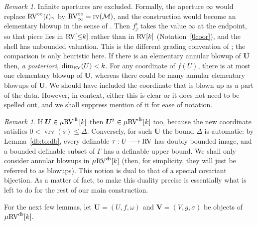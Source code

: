 \documentclass[12pt]{amsart}
\theoremstyle{plain}
\theoremstyle{definition}
\theoremstyle{remark}
\newtheorem{rem}[thm]{Remark}
\numberwithin{equation}{section}
\theoremstyle{plain}
\newcommand{\RV}{\textup{RV}}
\newcommand{\MM}{\mdl M}
\newcommand{\0}{\emptyset}
\newcommand{\mdl}[1]{\mathcal{#1}}  %
\newcommand{\fun}{\longrightarrow}
\newcommand{\mRV}{{\mu}{\RV}}
\DeclareMathOperator{\rv}{rv}
\DeclareMathOperator{\vrv}{vrv}
\DeclareMathOperator{\db}{d \! b}
\newcommand{\ccirc}{\circ \circ}
\begin{document}
\begin{rem}
Infinite apertures are excluded. Formally, the aperture $\infty$ would replace $\RV^{\ccirc}(t)_\gamma$ by $\RV^{\ccirc}_\infty = \rv(\MM)$, and the construction would become an elementary blowup in the sense of \cite[Definition~6.1]{Yin:int:acvf}. Then $f^\flat_j$ takes the value $\infty$ at the endpoint, so that piece lies in $\RV[{\leq}k]$ rather than in $\RV[k]$ (Notation~\ref{0coor}), and the shell has unbounded valuation. This is the different grading convention of \cite{Yin:int:acvf}; the comparison is only heuristic here. If there is an elementary annular blowup of $\bm U$ then, \textit{a posteriori}, $\dim_{\RV}(U) < k$. For any coordinate of $f(U)$, there is at most one elementary blowup of $\bm U$, whereas there could be many annular elementary blowups of $\bm U$. We should have included the coordinate that is blown up as a part of the data. However, in context, either this is
clear or it does not need to be spelled out, and we shall suppress mention of it for ease of notation.
\end{rem}

\begin{rem}
\label{db:blowup:bound}If $\bm U \in \mRV^{\db}[k]$ then $\bm U^{\flat} \in \mRV^{\db}[k]$ too, because the new coordinate satisfies $0 < \vrv(s) \leq \Delta$. Conversely, for such $\bm U$ the bound $\Delta$ is automatic: by Lemma~\ref{db:to:db}, every definable $\tau : U \fun \RV$ has doubly bounded image, and a bounded definable subset of $\Gamma$ has a definable upper bound. We shall only consider annular blowups  in $\mRV^{\db}[k]$ (then, for simplicity, they will just be referred to as blowups). This notion is dual to that of a  special covariant bijection. As a matter of fact, to make this duality precise is essentially what is left to do for the rest of our main construction.
\end{rem}


For the next few lemmas, let $\bm U = (U, f, \omega)$ and $\bm V = (V, g, \sigma)$ be objects of $\mRV^{\db}[k]$.

\end{document}
